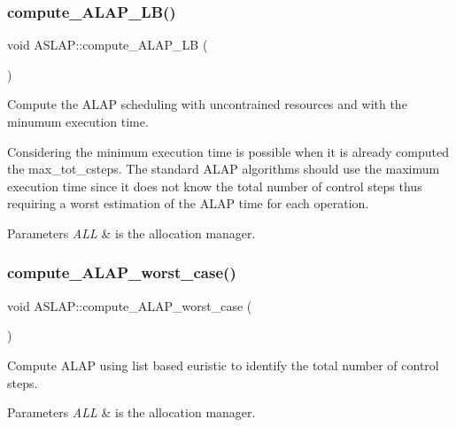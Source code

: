 \subsubsection{\texorpdfstring{compute\+\_\+\+A\+L\+A\+P\+\_\+\+L\+B()}{compute\_ALAP\_LB()}}
{\footnotesize\ttfamily void A\+S\+L\+A\+P\+::compute\+\_\+\+A\+L\+A\+P\+\_\+\+LB (\begin{DoxyParamCaption}{ }\end{DoxyParamCaption})\hspace{0.3cm}{\ttfamily [private]}}



Compute the A\+L\+AP scheduling with uncontrained resources and with the minumum execution time. 

Considering the minimum execution time is possible when it is already computed the max\+\_\+tot\+\_\+csteps. The standard A\+L\+AP algorithms should use the maximum execution time since it does not know the total number of control steps thus requiring a worst estimation of the A\+L\+AP time for each operation. 
\begin{DoxyParams}{Parameters}
{\em A\+LL} & is the allocation manager. \\
\hline
\end{DoxyParams}
\mbox{\label{classASLAP_af0ad5c5a9402cfcfd511a3c3bb4b4f6f}} 
\subsubsection{\texorpdfstring{compute\+\_\+\+A\+L\+A\+P\+\_\+worst\+\_\+case()}{compute\_ALAP\_worst\_case()}}
{\footnotesize\ttfamily void A\+S\+L\+A\+P\+::compute\+\_\+\+A\+L\+A\+P\+\_\+worst\+\_\+case (\begin{DoxyParamCaption}{ }\end{DoxyParamCaption})\hspace{0.3cm}{\ttfamily [private]}}



Compute A\+L\+AP using list based euristic to identify the total number of control steps. 


\begin{DoxyParams}{Parameters}
{\em A\+LL} & is the allocation manager. \\
\hline
\end{DoxyParams}


